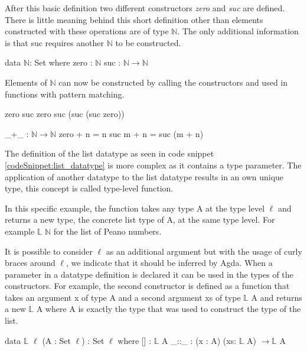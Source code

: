 After this basic definition two different constructors \emph{zero} and \emph{suc} are defined. 
There is little meaning behind this short definition other than elements constructed with these operations are of type $\mathbb{N}$.
The only additional information is that suc requires another $\mathbb{N}$ to be constructed.

\begin{codesnippet}[mathescape=true, caption={Definition of the peano natural numbers datatype in Agda}, label={codeSnippet:natural_number}]
data $\mathbb{N}$: Set where
  zero : $\mathbb{N}$
  suc : $\mathbb{N} \rightarrow \mathbb{N}$
\end{codesnippet}

Elements of $\mathbb{N}$ can now be constructed by calling the constructors and used in functions with pattern matching.

\begin{codesnippet}[mathescape=true, caption={Some peano numbers}, label={codeSnippet:natural_number_constructor}]
zero
suc zero
suc (suc (suc zero))
\end{codesnippet}
\begin{codesnippet}[mathescape=true, caption={Peano numbers addition}, label={codeSnippet:natural_number_addition}]
_+_ : $\mathbb{N} \rightarrow \mathbb{N}$
zero  + n = n
suc m + n = suc (m + n)
\end{codesnippet}


The definition of the list datatype as seen in code snippet \ref{codeSnippet:list_datatype} is more complex as it contains a type parameter. The application of another datatype to the list datatype results in an own unique type, this concept is called type-level function. 

In this specific example, the function takes any type A at the type level $\ell$ and returns a new type, the concrete list type of A, at the same type level.
For example $\mathbb{L}$ $\mathbb{N}$ for the list of Peano numbers.

It is possible to consider $\ell$ as an additional argument but with the usage of curly braces around $\ell$, we indicate that it should be inferred by Agda.
When a parameter in a datatype definition is declared it can be used in the types of the constructors. 
For example, the second constructor is defined as a function that takes an argument x of type A and a second argument xs of type $\mathbb{L}$ A and returns a new $\mathbb{L}$ A where A is exactly the type that was used to construct the type of the list.
\begin{codesnippet}[mathescape=true, caption={Definition of the list datatype in Agda}, label={codeSnippet:list_datatype}]
data $\mathbb{L}$ {$\ell$} (A : Set $\ell$) : Set $\ell$ where
  [] : $\mathbb{L}$ A
  _::_ : (x : A) (xs: $\mathbb{L}$ A) $\rightarrow \mathbb{L}$ A
\end{codesnippet}


